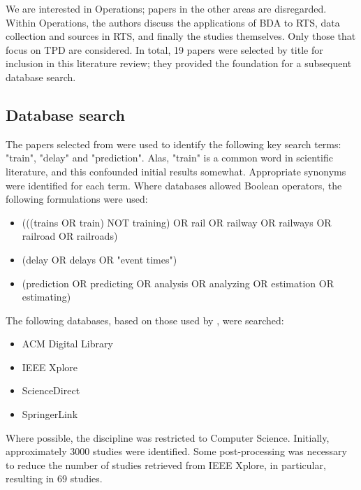 \documentclass{article}
\begin{document}
We are interested in Operations; papers in the other areas are disregarded. Within Operations, the authors discuss the applications of BDA to RTS, data collection and sources in RTS, and finally the studies themselves.
Only those that focus on TPD are considered. In total, 19 papers were selected by title for inclusion in this literature review; they provided the foundation for a subsequent database search.

\subsection{Database search}

The papers selected from \cite{ghofrani_et_al_2018} were used to identify the following key search terms: "train", "delay" and "prediction". Alas, "train" is a common word in scientific literature, and this confounded initial results somewhat. Appropriate synonyms were identified for each term. Where databases allowed Boolean operators, the following formulations were used:
\begin{itemize}
	\item (((trains OR train) NOT training) OR rail OR railway OR railways OR railroad OR railroads)
	\item (delay OR delays OR "event times")
	\item (prediction OR predicting OR analysis OR analyzing OR estimation OR estimating)
\end{itemize}

The following databases, based on those used by \cite{heckman_williams_2011}, were searched:

\begin{itemize}
	\item ACM Digital Library
	\item IEEE Xplore
	\item ScienceDirect
	\item SpringerLink
\end{itemize}

Where possible, the discipline was restricted to Computer Science. Initially, approximately 3000 studies were identified. Some post-processing was necessary to reduce the number of studies retrieved from IEEE Xplore, in particular, resulting in 69 studies.

\end{document}
